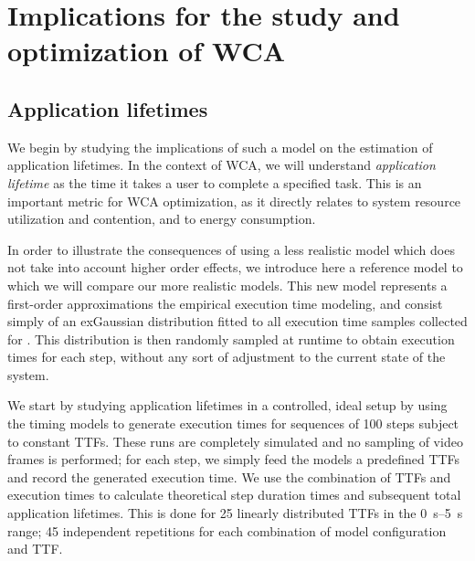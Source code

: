\section{Implications for the study and optimization of \acs{WCA}}\label{sec:implications}

\subsection{Application lifetimes}

We begin by studying the implications of such a model on the estimation of application lifetimes.
In the context of \ac{WCA}, we will understand \emph{application lifetime} as the time it takes a user to complete a specified task.
This is an important metric for \ac{WCA} optimization, as it directly relates to system resource utilization and contention, and to energy consumption.

In order to illustrate the consequences of using a less realistic model which does not take into account higher order effects, we introduce here a reference model to which we will compare our more realistic models.
This new model represents a first-order approximations the empirical execution time modeling, and consist simply of an \ac{exGaussian} distribution fitted to all execution time samples collected for \textcite{olguinmunoz:impact2021}.
This distribution is then randomly sampled at runtime to obtain execution times for each step, without any sort of adjustment to the current state of the system.

We start by studying application lifetimes in a controlled, ideal setup by using the timing models to generate execution times for sequences of \num{100} steps subject to constant \acp{TTF}.
These runs are completely simulated and no sampling of video frames is performed; for each step, we simply feed the models a predefined \acp{TTF} and record the generated execution time.
We use the combination of \acp{TTF} and execution times to calculate theoretical step duration times and subsequent total application lifetimes.
This is done for \num{25} linearly distributed \acp{TTF} in the \SIrange[]{0}{5}{\second} range; \num{45} independent repetitions for each combination of model configuration and \ac{TTF}.

